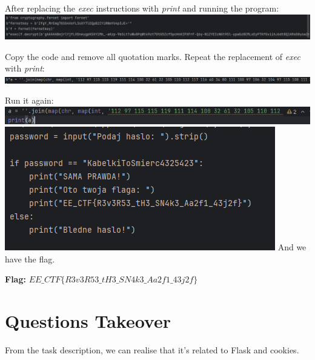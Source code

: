 \documentclass{article}
\begin{document}
After replacing the \textit{exec} instructions with \textit{print} and running the program:
\vspace{3mm} \\
\includegraphics[width=\textwidth]{"image8.jpeg"}

Copy the code and remove all quotation marks. Repeat the replacement of \textit{exec} with \textit{print}:
\vspace{3mm} \\
\includegraphics[width=\textwidth]{"image9.png"}

Run it again:
\vspace{3mm} \\
\includegraphics[width=\textwidth]{"image10.png"}
\vspace{3mm}
\includegraphics[width=\textwidth]{"image11.png"}
And we have the flag.
\vspace{3mm}

\textbf{Flag:} $ EE\_CTF\{R3v3R53\_tH3\_SN4k3\_Aa2f1\_43j2f\} $

\newpage
\section{Questions Takeover}
From the task description, we can realise that it’s related to Flask and cookies.
\vspace{3mm}
\end{document}
